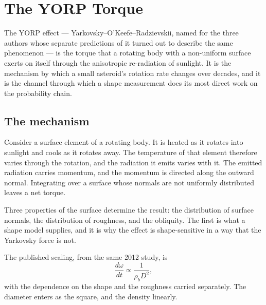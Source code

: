 
\chapter{The YORP Torque}
\label{ch:yorp}

The YORP effect --- Yarkovsky--O'Keefe--Radzievskii, named for the three
authors whose separate predictions of it turned out to describe the same
phenomenon --- is the torque that a rotating body with a non-uniform surface
exerts on itself through the anisotropic re-radiation of sunlight. It is the
mechanism by which a small asteroid's rotation rate changes over decades,
and it is the channel through which a shape measurement does its most
direct work on the probability chain.

\section{The mechanism}

Consider a surface element of a rotating body. It is heated as it rotates
into sunlight and cools as it rotates away. The temperature of that element
therefore varies through the rotation, and the radiation it emits varies with
it. The emitted radiation carries momentum, and the momentum is directed
along the outward normal. Integrating over a surface whose normals are not
uniformly distributed leaves a net torque.

Three properties of the surface determine the result: the distribution of
surface normals, the distribution of roughness, and the obliquity. The
first is what a shape model supplies, and it is why the effect is
shape-sensitive in a way that the Yarkovsky force is not.

The published scaling, from the same 2012 study, is
\begin{equation}
\frac{d\omega}{d t} \propto \frac{1}{\rho_b D^{2}},
\label{eq:yorp}
\end{equation}
with the dependence on the shape and the roughness carried separately. The
diameter enters as the square, and the density linearly.

